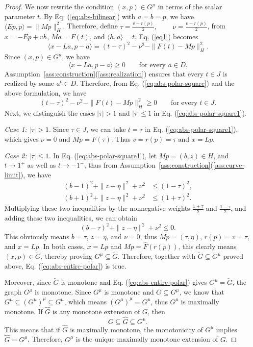 \documentclass[11pt]{article}
\newcommand{\pair}[2]{\langle #1,#2\rangle}
\theoremstyle{definition}
\theoremstyle{remark}
\begin{document}
\begin{proof}
We now rewrite the condition $(x,p)\in G^\mu$ in terms of the scalar parameter $t$. 
By Eq. (\ref{eq:abs-bilinear}) with $a=b=p$, we have $\pair{Ep}{p}=\|Mp\|_H^2$.  Therefore, define $\tau=\frac{v+r(p)}2,~\qquad \nu=\frac{v-r(p)}2$, from $x=-Ep+vh$, $Ma=F(t)$, and $\pair{h}{a}=t$, Eq. (\ref{eq1}) becomes 
\begin{equation}
\pair{x-La}{p-a}
=(t-\tau)^2-\nu^2-\|F(t)-Mp\|_H^2.
\label{eq:abs-polar-square}
\end{equation}
Since $(x,p)\in G^\mu$, we have 
\[
\pair{x-La}{p-a}\ge0
\qquad\text{for every }a\in D.
\]
Assumption~\ref{ass:construction}\textup{(\ref{ass:realization})} ensures that every $t\in J$ is realized by some $a^t\in D$. Therefore, from Eq. (\ref{eq:abs-polar-square}) and the above formulation, we have 
\begin{equation}
(t-\tau)^2-\nu^2-\|F(t)-Mp\|_H^2\ge0
\qquad\text{for every }t\in J.
\label{eq:abs-polar-square1}
\end{equation}
Next, we distinguish the cases $|\tau|>1$ and $|\tau|\le1$ in Eq. (\ref{eq:abs-polar-square1}).





\emph{Case 1: $|\tau|>1$.}  Since $\tau\in J$, we can take $t=\tau$ in Eq. (\ref{eq:abs-polar-square1}), which gives $\nu=0$ and $Mp=F(\tau)$. Thus $v=r(p)=\tau$ and $x=Lp$.

\emph{Case 2: $|\tau|\le1$.} In Eq. (\ref{eq:abs-polar-square1}), let $Mp=(b,z)\in H$, and $t\to1^+$ as well as $t\to-1^-$, thus from Assumption~\ref{ass:construction}\textup{(\ref{ass:curve-limit})}, we have 
\[
\begin{aligned}
(b-1)^2+\|z-\eta\|^2+\nu^2&\le(1-\tau)^2,\\
(b+1)^2+\|z-\eta\|^2+\nu^2&\le(1+\tau)^2.
\end{aligned}
\]
Multiplying these two inequalities by the nonnegative weights $\frac{1+\tau}{2}$ and $\frac{1-\tau}{2}$, and adding these two inequalities, we can obtain
\[
(b-\tau)^2+\|z-\eta\|^2+\nu^2\le0.
\]
This obviously means $b=\tau$, $z=\eta$, and $\nu=0$, thus $Mp=(\tau,\eta)$, $r(p)=v=\tau$, and $x=Lp$. 
In both cases, $x=Lp$ and $Mp=\widehat F(r(p))$, this clearly means $(x,p)\in\widetilde G$, thereby proving $G^\mu\subseteq\widetilde G$. Therefore, together with $\widetilde G\subseteq G^\mu$ proved above, Eq. (\ref{eq:abs-entire-polar}) is true.  





Moreover, since $\widetilde G$ is monotone and Eq. (\ref{eq:abs-entire-polar}) gives $G^\mu=\widetilde G$, the graph $G^\mu$ is monotone. Since $G^\mu$ is monotone and $G\subseteq G^\mu$, we know that $G^\mu\subseteq (G^\mu)^\mu\subseteq G^\mu$, which means $(G^\mu)^\mu=G^\mu$, thus $G^\mu$ is maximally monotone. 
If $\widehat G$ is any monotone extension of $G$, then 
\[
G\subseteq\widehat G\subseteq G^\mu.
\]
This means that if $\widehat G$ is maximally monotone, the monotonicity of $G^\mu$ implies $\widehat G=G^\mu$. Therefore, $G^\mu$ is the unique maximally monotone extension of $G$.  








\end{proof}
\end{document}
